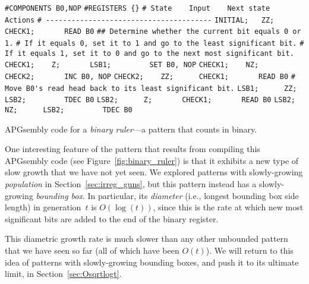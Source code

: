 \begin{apgsembly}
	\begin{algorithmic}\small
		\State \verb|#COMPONENTS B0,NOP|
		\State \verb|#REGISTERS {}|
		\State \verb|# State    Input    Next state    Actions|
		\State \verb|# ---------------------------------------|
		\State \verb|INITIAL;   ZZ;      CHECK1;       READ B0|
		\State
		\State \verb|## Determine whether the current bit equals 0 or 1.|
		\State \verb|# If it equals 0, set it to 1 and go to the least significant bit.|
		\State \verb|# If it equals 1, set it to 0 and go to the next most significant bit.|
		\State \verb|CHECK1;    Z;       LSB1;         SET B0, NOP|
		\State \verb|CHECK1;    NZ;      CHECK2;       INC B0, NOP|
		\State \verb|CHECK2;    ZZ;      CHECK1;       READ B0|
		\State
		\State \verb|# Move B0's read head back to its least significant bit.|
		\State \verb|LSB1;      ZZ;      LSB2;         TDEC B0|
		\State \verb|LSB2;      Z;       CHECK1;       READ B0|
		\State \verb|LSB2;      NZ;      LSB2;         TDEC B0|
	\end{algorithmic}
	\caption{APGsembly code for a \emph{binary ruler}---a pattern that counts in binary.}\label{alg:apgsembly_binary_ruler}
\end{apgsembly}

One interesting feature of the pattern that results from compiling this APGsembly code (see Figure~\ref{fig:binary_ruler}) is that it exhibits a new type of slow growth that we have not yet seen. We explored patterns with slowly-growing \emph{population} in Section~\ref{sec:irreg_guns}, but this pattern instead has a slowly-growing \emph{bounding box}. In particular, its \emph{diameter} (i.e., longest bounding box side length) in generation~$t$ is $O(\log(t))$, since this is the rate at which new most significant bits are added to the end of the binary register.


This diametric growth rate is much slower than any other unbounded pattern that we have seen so far (all of which have been $O(t)$). We will return to this idea of patterns with slowly-growing bounding boxes, and push it to its ultimate limit, in Section~\ref{sec:Osqrtlogt}.



